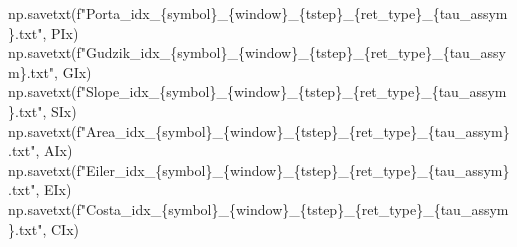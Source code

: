 \documentclass[
  letterpaper,
]{report}
\newenvironment{Shaded}{\begin{snugshade}}{\end{snugshade}}
\newcommand{\NormalTok}[1]{\textcolor[rgb]{0.00,0.23,0.31}{#1}}
\newcommand{\SpecialCharTok}[1]{\textcolor[rgb]{0.37,0.37,0.37}{#1}}
\newcommand{\SpecialStringTok}[1]{\textcolor[rgb]{0.13,0.47,0.30}{#1}}
\begin{document}
\begin{Shaded}
\begin{Highlighting}[]
\NormalTok{np.savetxt(}\SpecialStringTok{f"Porta\_idx\_}\SpecialCharTok{\{}\NormalTok{symbol}\SpecialCharTok{\}}\SpecialStringTok{\_}\SpecialCharTok{\{}\NormalTok{window}\SpecialCharTok{\}}\SpecialStringTok{\_}\SpecialCharTok{\{}\NormalTok{tstep}\SpecialCharTok{\}}\SpecialStringTok{\_}\SpecialCharTok{\{}\NormalTok{ret\_type}\SpecialCharTok{\}}\SpecialStringTok{\_}\SpecialCharTok{\{}\NormalTok{tau\_assym}\SpecialCharTok{\}}\SpecialStringTok{.txt"}\NormalTok{, PIx)}
\NormalTok{np.savetxt(}\SpecialStringTok{f"Gudzik\_idx\_}\SpecialCharTok{\{}\NormalTok{symbol}\SpecialCharTok{\}}\SpecialStringTok{\_}\SpecialCharTok{\{}\NormalTok{window}\SpecialCharTok{\}}\SpecialStringTok{\_}\SpecialCharTok{\{}\NormalTok{tstep}\SpecialCharTok{\}}\SpecialStringTok{\_}\SpecialCharTok{\{}\NormalTok{ret\_type}\SpecialCharTok{\}}\SpecialStringTok{\_}\SpecialCharTok{\{}\NormalTok{tau\_assym}\SpecialCharTok{\}}\SpecialStringTok{.txt"}\NormalTok{, GIx)}
\NormalTok{np.savetxt(}\SpecialStringTok{f"Slope\_idx\_}\SpecialCharTok{\{}\NormalTok{symbol}\SpecialCharTok{\}}\SpecialStringTok{\_}\SpecialCharTok{\{}\NormalTok{window}\SpecialCharTok{\}}\SpecialStringTok{\_}\SpecialCharTok{\{}\NormalTok{tstep}\SpecialCharTok{\}}\SpecialStringTok{\_}\SpecialCharTok{\{}\NormalTok{ret\_type}\SpecialCharTok{\}}\SpecialStringTok{\_}\SpecialCharTok{\{}\NormalTok{tau\_assym}\SpecialCharTok{\}}\SpecialStringTok{.txt"}\NormalTok{, SIx)}
\NormalTok{np.savetxt(}\SpecialStringTok{f"Area\_idx\_}\SpecialCharTok{\{}\NormalTok{symbol}\SpecialCharTok{\}}\SpecialStringTok{\_}\SpecialCharTok{\{}\NormalTok{window}\SpecialCharTok{\}}\SpecialStringTok{\_}\SpecialCharTok{\{}\NormalTok{tstep}\SpecialCharTok{\}}\SpecialStringTok{\_}\SpecialCharTok{\{}\NormalTok{ret\_type}\SpecialCharTok{\}}\SpecialStringTok{\_}\SpecialCharTok{\{}\NormalTok{tau\_assym}\SpecialCharTok{\}}\SpecialStringTok{.txt"}\NormalTok{, AIx)}
\NormalTok{np.savetxt(}\SpecialStringTok{f"Eiler\_idx\_}\SpecialCharTok{\{}\NormalTok{symbol}\SpecialCharTok{\}}\SpecialStringTok{\_}\SpecialCharTok{\{}\NormalTok{window}\SpecialCharTok{\}}\SpecialStringTok{\_}\SpecialCharTok{\{}\NormalTok{tstep}\SpecialCharTok{\}}\SpecialStringTok{\_}\SpecialCharTok{\{}\NormalTok{ret\_type}\SpecialCharTok{\}}\SpecialStringTok{\_}\SpecialCharTok{\{}\NormalTok{tau\_assym}\SpecialCharTok{\}}\SpecialStringTok{.txt"}\NormalTok{, EIx)}
\NormalTok{np.savetxt(}\SpecialStringTok{f"Costa\_idx\_}\SpecialCharTok{\{}\NormalTok{symbol}\SpecialCharTok{\}}\SpecialStringTok{\_}\SpecialCharTok{\{}\NormalTok{window}\SpecialCharTok{\}}\SpecialStringTok{\_}\SpecialCharTok{\{}\NormalTok{tstep}\SpecialCharTok{\}}\SpecialStringTok{\_}\SpecialCharTok{\{}\NormalTok{ret\_type}\SpecialCharTok{\}}\SpecialStringTok{\_}\SpecialCharTok{\{}\NormalTok{tau\_assym}\SpecialCharTok{\}}\SpecialStringTok{.txt"}\NormalTok{, CIx)}
\end{Highlighting}
\end{Shaded}
\end{document}
